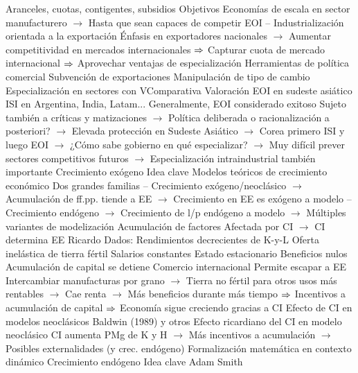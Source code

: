 \documentclass{nuevotema}
\begin{document}
\begin{esquemal}
				\4[] Aranceles, cuotas, contigentes, subsidios
				\4 Objetivos
				\4[] Economías de escala en sector manufacturero
				\4[] $\to$ Hasta que sean capaces de competir
			\3 EOI -- Industrialización orientada a la exportación
				\4 Énfasis en exportadores nacionales
				\4[] $\to$ Aumentar competitividad en mercados internacionales
				\4[] $\Rightarrow$ Capturar cuota de mercado internacional
				\4[] $\Rightarrow$ Aprovechar ventajas de especialización
				\4 Herramientas de política comercial
				\4[] Subvención de exportaciones
				\4[] Manipulación de tipo de cambio
				\4[] Especialización en sectores con VComparativa
			\3 Valoración
				\4 EOI en sudeste asiático
				\4 ISI en Argentina, India, Latam...
				\4 Generalmente, EOI considerado exitoso
				\4[] Sujeto también a críticas y matizaciones
				\4[] $\to$ Política deliberada o racionalización a posteriori?
				\4[] $\to$ Elevada protección en Sudeste Asiático
				\4[] $\to$ Corea primero ISI y luego EOI
				\4[] $\to$ ¿Cómo sabe gobierno en qué especializar?
				\4[] $\to$ Muy difícil prever sectores competitivos futuros
				\4[] $\to$ Especialización intraindustrial también importante
		\2 Crecimiento exógeno
			\3 Idea clave
				\4 Modelos teóricos de crecimiento económico
				\4[] Dos grandes familias
				\4[] -- Crecimiento exógeno/neoclásico
				\4[] $\to$ Acumulación de ff.pp. tiende a EE
				\4[] $\to$ Crecimiento en EE es exógeno a modelo
				\4[] -- Crecimiento endógeno
				\4[] $\to$ Crecimiento de l/p endógeno a modelo
				\4[] $\to$ Múltiples variantes de modelización
				\4 Acumulación de factores
				\4[] Afectada por CI
				\4[] $\to$ CI determina EE
			\3 Ricardo
				\4 Dados:
				\4[] Rendimientos decrecientes de K-y-L
				\4[] Oferta inelástica de tierra fértil
				\4[] Salarios constantes
				\4 Estado estacionario
				\4[] Beneficios nulos
				\4[] Acumulación de capital se detiene
				\4 Comercio internacional
				\4[] Permite escapar a EE
				\4[] Intercambiar manufacturas por grano
				\4[] $\to$ Tierra no fértil para otros usos más rentables
				\4[] $\to$ Cae renta
				\4[] $\to$ Más beneficios durante más tiempo
				\4[] $\Rightarrow$ Incentivos a acumulación de capital
				\4[] $\Rightarrow$ Economía sigue creciendo gracias a CI
			\3 Efecto de CI en modelos neoclásicos
				\4 Baldwin (1989) y otros
				\4 Efecto ricardiano del CI en modelo neoclásico
				\4 CI aumenta PMg de K y H
				\4[] $\to$ Más incentivos a acumulación
				\4[] $\to$ Posibles externalidades (y crec. endógeno)
				\4 Formalización matemática en contexto dinámico
		\2 Crecimiento endógeno
			\3 Idea clave
				\4 Adam Smith

\end{esquemal}
\end{document}
